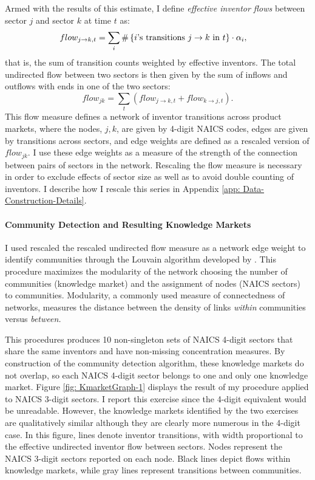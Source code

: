 Armed with the results of this estimate, I define \emph{effective
inventor flows} between sector $j$ and sector $k$ at time $t$ as:
\begin{align*}
flow_{j\rightarrow k,t} & =\sum_{i}\#\left\{ \text{\ensuremath{i\text{'s}\ \text{transitions}\ j\rightarrow k\text{ \ensuremath{\text{in}} }t}}\right\} \cdot\alpha_{i},
\end{align*}
that is, the sum of transition counts weighted by effective inventors.
The total undirected flow between two sectors is then given by the
sum of inflows and outflows with ends in one of the two sectors:
\[
flow_{jk}=\sum_{t}\left(flow_{j\rightarrow k,t}+flow_{k\rightarrow j,t}\right).
\]
This flow measure defines a network of inventor transitions across
product markets, where the nodes, $j,k$, are given by 4-digit NAICS
codes, edges are given by transitions across sectors, and edge weights
are defined as a rescaled version of $flow_{jk}.$ I use these edge
weights as a measure of the strength of the connection between pairs
of sectors in the network. Rescaling the flow measure is necessary
in order to exclude effects of sector size as well as to avoid double
counting of inventors. I describe how I rescale this series in Appendix
\ref{app: Data-Construction-Details}.

\paragraph{Community Detection and Resulting Knowledge Markets}

I used rescaled the rescaled undirected flow measure as a network
edge weight to identify communities through the Louvain algorithm
developed by \citet{blondelFastUnfoldingCommunities2008}. This procedure
maximizes the modularity of the network choosing the number of communities
(knowledge market) and the assignment of nodes (NAICS sectors) to
communities. Modularity, a commonly used measure of connectedness
of networks, measures the distance between the density of links \emph{within
}communities versus \emph{between.}

This procedures produces 10 non-singleton sets of NAICS 4-digit sectors
that share the same inventors and have non-missing concentration measures.
By construction of the community detection algorithm, these knowledge
markets do not overlap, so each NAICS 4-digit sector belongs to one
and only one knowledge market. Figure \ref{fig: KmarketGraph-1} displays
the result of my procedure applied to NAICS 3-digit sectors. I report
this exercise since the 4-digit equivalent would be unreadable. However,
the knowledge markets identified by the two exercises are qualitatively
similar although they are clearly more numerous in the 4-digit case.
In this figure,{\footnotesize{} }lines denote inventor transitions,
with width proportional to the effective undirected inventor flow
between sectors. Nodes represent the NAICS 3-digit sectors reported
on each node. Black lines depict flows within knowledge markets, while
gray lines represent transitions between communities.

